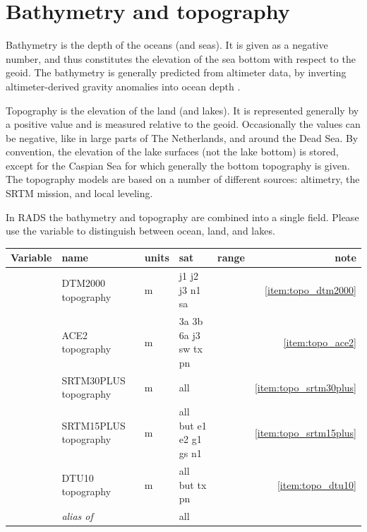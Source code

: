 \documentclass[a4paper,11pt,openany,natbib,nomargin]{thesis}
\newcommand\alias[1]{\emph{alias of} \var{#1}}
\newenvironment{vartable}{
\begin{table}[ht]
\small
\begin{tabular}{lllllr}
\hline\hline
Variable & name & units & sat & range & note \\
\hline\hline
}{
\hline
\end{tabular}
\end{table}
}
\begin{document}
\section{Bathymetry and topography}
\label{var:topo}
Bathymetry is the depth of the oceans (and seas). It is given as a negative number, and thus constitutes the elevation of the sea bottom with respect to the geoid.
The bathymetry is generally predicted from altimeter data, by inverting altimeter-derived gravity anomalies into ocean depth \citep[e.g.]{smith1994h}.

Topography is the elevation of the land (and lakes). It is represented generally by a positive value and is measured relative to the geoid. Occasionally the values can be negative, like in large parts of The Netherlands, and around the Dead Sea. By convention, the elevation of the lake surfaces (not the lake bottom) is stored, except for the Caspian Sea for which generally the bottom topography is given. The topography models are based on a number of different sources: altimetry, the SRTM mission, and local leveling.

In RADS the bathymetry and topography are combined into a single field. Please use the  variable to distinguish between ocean, land, and lakes.

\begin{vartable}
\var{topo_dtm2000}    & DTM2000 topography    & m & j1 j2 j3 n1 sa & & \ref{item:topo_dtm2000} \\
\var{topo_ace2}       & ACE2 topography       & m & 3a 3b 6a j3 sw tx pn & & \ref{item:topo_ace2} \\
\var{topo_srtm30plus} & SRTM30PLUS topography & m & all & & \ref{item:topo_srtm30plus} \\
\var{topo_srtm15plus} & SRTM15PLUS topography & m & all but e1 e2 g1 gs n1 & & \ref{item:topo_srtm15plus} \\
\var{topo_dtu10}      & DTU10 topography      & m & all but tx pn & & \ref{item:topo_dtu10} \\
\hline
\var{topo}            & \alias{topo_srtm15plus} \var{topo_srtm30plus} && all && \\
\end{vartable}
\end{document}
